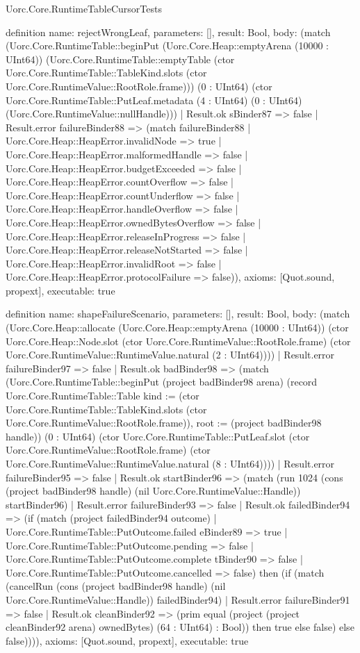 \begin{lexlean}{Uorc.Core.RuntimeTableCursorTests}
\begin{semanticmodule}
definition{
  name: rejectWrongLeaf,
  parameters: [],
  result: Bool,
  body: (match (Uorc.Core.RuntimeTable::beginPut (Uorc.Core.Heap::emptyArena (10000 : UInt64)) (Uorc.Core.RuntimeTable::emptyTable (ctor Uorc.Core.RuntimeTable::TableKind.slots (ctor Uorc.Core.RuntimeValue::RootRole.frame))) (0 : UInt64) (ctor Uorc.Core.RuntimeTable::PutLeaf.metadata (4 : UInt64) (0 : UInt64) (Uorc.Core.RuntimeValue::nullHandle)))
    | Result.ok sBinder87 => false
    | Result.error failureBinder88 => (match failureBinder88
      | Uorc.Core.Heap::HeapError.invalidNode => true
      | Uorc.Core.Heap::HeapError.malformedHandle => false
      | Uorc.Core.Heap::HeapError.budgetExceeded => false
      | Uorc.Core.Heap::HeapError.countOverflow => false
      | Uorc.Core.Heap::HeapError.countUnderflow => false
      | Uorc.Core.Heap::HeapError.handleOverflow => false
      | Uorc.Core.Heap::HeapError.ownedBytesOverflow => false
      | Uorc.Core.Heap::HeapError.releaseInProgress => false
      | Uorc.Core.Heap::HeapError.releaseNotStarted => false
      | Uorc.Core.Heap::HeapError.invalidRoot => false
      | Uorc.Core.Heap::HeapError.protocolFailure => false)),
  axioms: [Quot.sound, propext],
  executable: true
}

definition{
  name: shapeFailureScenario,
  parameters: [],
  result: Bool,
  body: (match (Uorc.Core.Heap::allocate (Uorc.Core.Heap::emptyArena (10000 : UInt64)) (ctor Uorc.Core.Heap::Node.slot (ctor Uorc.Core.RuntimeValue::RootRole.frame) (ctor Uorc.Core.RuntimeValue::RuntimeValue.natural (2 : UInt64))))
    | Result.error failureBinder97 => false
    | Result.ok badBinder98 => (match (Uorc.Core.RuntimeTable::beginPut (project badBinder98 arena) (record Uorc.Core.RuntimeTable::Table {kind := (ctor Uorc.Core.RuntimeTable::TableKind.slots (ctor Uorc.Core.RuntimeValue::RootRole.frame)), root := (project badBinder98 handle)}) (0 : UInt64) (ctor Uorc.Core.RuntimeTable::PutLeaf.slot (ctor Uorc.Core.RuntimeValue::RootRole.frame) (ctor Uorc.Core.RuntimeValue::RuntimeValue.natural (8 : UInt64))))
      | Result.error failureBinder95 => false
      | Result.ok startBinder96 => (match (run 1024 (cons (project badBinder98 handle) (nil Uorc.Core.RuntimeValue::Handle)) startBinder96)
        | Result.error failureBinder93 => false
        | Result.ok failedBinder94 => (if (match (project failedBinder94 outcome)
          | Uorc.Core.RuntimeTable::PutOutcome.failed eBinder89 => true
          | Uorc.Core.RuntimeTable::PutOutcome.pending => false
          | Uorc.Core.RuntimeTable::PutOutcome.complete tBinder90 => false
          | Uorc.Core.RuntimeTable::PutOutcome.cancelled => false) then (if (match (cancelRun (cons (project badBinder98 handle) (nil Uorc.Core.RuntimeValue::Handle)) failedBinder94)
          | Result.error failureBinder91 => false
          | Result.ok cleanBinder92 => (prim equal (project (project cleanBinder92 arena) ownedBytes) (64 : UInt64) : Bool)) then true else false) else false)))),
  axioms: [Quot.sound, propext],
  executable: true
}


\end{semanticmodule}
\end{lexlean}
